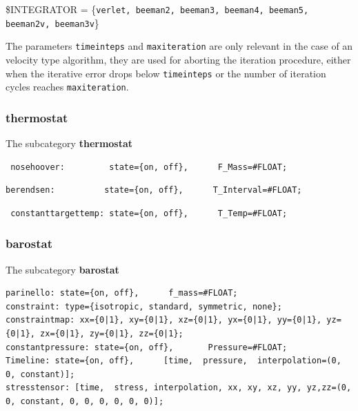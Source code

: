 \$INTEGRATOR = \{{\tt verlet, beeman2, beeman3, beeman4, beeman5, beeman2v, beeman3v}\}

The parameters \texttt{timeinteps} and \texttt{maxiteration} are only relevant in the case of an velocity type algorithm, they are used for aborting the iteration procedure, either when the iterative error drops below \texttt{timeinteps} or the number of iteration cycles reaches \texttt{maxiteration}.

\subsubsection{thermostat}
The subcategory \textbf{thermostat}
\begin{lstlisting} nosehoover:         state={on, off},      F_Mass=#FLOAT; 
\end{lstlisting}
\begin{lstlisting}
berendsen:          state={on, off},      T_Interval=#FLOAT;
\end{lstlisting}
\begin{lstlisting} constanttargettemp: state={on, off},      T_Temp=#FLOAT;
\end{lstlisting}

\subsubsection{barostat}                   
The subcategory \textbf{barostat}
{\small
\begin{lstlisting}
parinello: state={on, off},      f_mass=#FLOAT;
constraint: type={isotropic, standard, symmetric, none};
constraintmap: xx={0|1}, xy={0|1}, xz={0|1}, yx={0|1}, yy={0|1}, yz={0|1}, zx={0|1}, zy={0|1}, zz={0|1};
constantpressure: state={on, off},       Pressure=#FLOAT;
Timeline: state={on, off},      [time,  pressure,  interpolation=(0, 0, constant)];
stresstensor: [time,  stress, interpolation, xx, xy, xz, yy, yz,zz=(0, 0, constant, 0, 0, 0, 0, 0, 0)];
\end{lstlisting}
}

